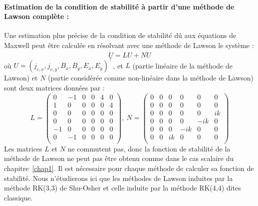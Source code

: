\paragraph{Estimation de la condition de stabilité à partir d'une méthode de Lawson complète :\\}
Une estimation plus précise de la condition de stabilité dû aux équations de Maxwell peut être calculée en résolvant avec une méthode de Lawson le système :
$$
  \dot{U} = LU + NU
$$
où $U = (j_{c,x},j_{c,y},B_x,B_y,E_x,E_y)^\top$, et $L$ (partie linéaire de la méthode de Lawson) et $N$ (partie considérée comme non-linéaire dans la méthode de Lawson) sont deux matrices données par :
$$  L = \begin{pmatrix}
    0 & -1 & 0 & 0 & 4 & 0 \\
    1 &  0 & 0 & 0 & 0 & 4 \\
    0 &  0 & 0 & 0 & 0 & 0 \\
    0 &  0 & 0 & 0 & 0 & 0 \\
   -1 &  0 & 0 & 0 & 0 & 0 \\
    0 & -1 & 0 & 0 & 0 & 0 \\
  \end{pmatrix},
  \ 
  N = \begin{pmatrix}
    0 & 0 & 0  &  0  &  0  & 0  \\
    0 & 0 & 0  &  0  &  0  & 0  \\
    0 & 0 & 0  &  0  &  0  & ik \\
    0 & 0 & 0  &  0  & -ik & 0  \\
    0 & 0 & 0  & -ik &  0  & 0  \\
    0 & 0 & ik &  0  &  0  & 0  \\
  \end{pmatrix}
$$
Les matrices $L$ et $N$ ne commutent pas, donc la fonction de stabilité de la méthode de Lawson ne peut pas être obtenu comme dans le cas scalaire du chapitre~\ref{chap1}. Il est nécessaire pour chaque méthode de calculer sa fonction de stabilité. Nous n'étudierons ici que les méthodes de Lawson induites par la méthode RK(3,3) de Shu-Osher et celle induite par la méthode RK(4,4) dites classique.


